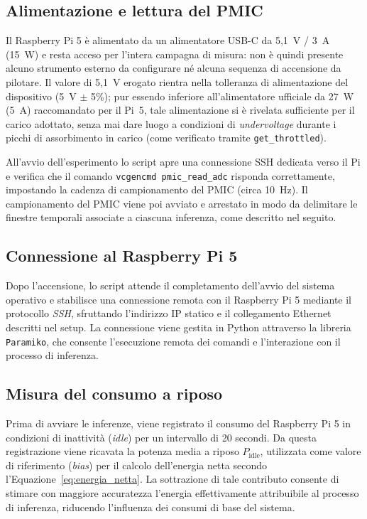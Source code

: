 \subsection{Alimentazione e lettura del PMIC}

Il Raspberry Pi 5 è alimentato da un alimentatore USB-C da 5,1~V / 3~A (15~W) e
resta acceso per l'intera campagna di misura: non è quindi presente alcuno
strumento esterno da configurare né alcuna sequenza di accensione da pilotare. Il
valore di 5,1~V erogato rientra nella tolleranza di alimentazione del dispositivo
(5~V $\pm$ 5\%); pur essendo inferiore all'alimentatore ufficiale da 27~W (5~A)
raccomandato per il Pi~5, tale alimentazione si è rivelata sufficiente per il carico
adottato, senza mai dare luogo a condizioni di \textit{undervoltage} durante i picchi
di assorbimento in carico (come verificato tramite \texttt{get\_throttled}).

All'avvio dell'esperimento lo script apre una connessione SSH dedicata verso il
Pi e verifica che il comando \texttt{vcgencmd pmic\_read\_adc} risponda
correttamente, impostando la cadenza di campionamento del PMIC (circa 10~Hz). Il
campionamento del PMIC viene poi avviato e arrestato in modo da delimitare le
finestre temporali associate a ciascuna inferenza, come descritto nel seguito.

\subsection{Connessione al Raspberry Pi 5}

Dopo l'accensione, lo script attende il completamento dell'avvio del sistema
operativo e stabilisce una connessione remota con il Raspberry Pi 5 mediante il
protocollo \textit{SSH}, sfruttando l'indirizzo IP statico e il collegamento
Ethernet descritti nel setup. La connessione viene gestita in Python attraverso la
libreria \texttt{Paramiko}, che consente l'esecuzione remota dei comandi e
l'interazione con il processo di inferenza.

\subsection{Misura del consumo a riposo}
\label{sec:bias}

Prima di avviare le inferenze, viene registrato il consumo del Raspberry Pi 5 in
condizioni di inattività (\textit{idle}) per un intervallo di 20 secondi. Da
questa registrazione viene ricavata la potenza media a riposo $P_{\text{idle}}$,
utilizzata come valore di riferimento (\textit{bias}) per il calcolo dell'energia
netta secondo l'Equazione~\ref{eq:energia_netta}. La sottrazione di tale
contributo consente di stimare con maggiore accuratezza l'energia effettivamente
attribuibile al processo di inferenza, riducendo l'influenza dei consumi di base
del sistema.

